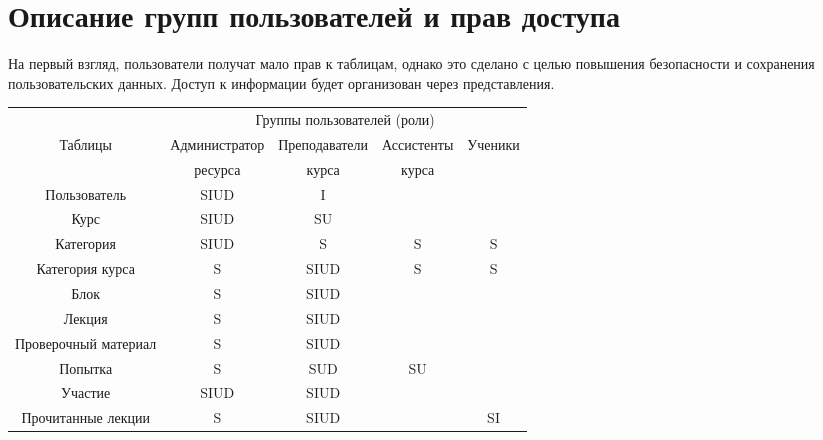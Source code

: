 \documentclass[a4paper,14pt]{article}
\begin{document}
\section{Описание групп пользователей и прав доступа}

На первый взгляд, пользователи получат мало прав  к таблицам, однако это сделано с целью повышения безопасности и сохранения пользовательских данных.
Доступ к информации будет организован через представления.

\begin{table}[H]
	\begin{flushleft} 
	\end{flushleft}
\begin{tabular}{|c|c|c|c|c|}
	\hline
	                     &   \multicolumn{4}{c|}{Группы пользователей (роли)}   \\ \cline{2-5}
	      Таблицы        & Администратор & Преподаватели & Ассистенты & Ученики \\
	                     &    ресурса    &     курса     &   курса    &         \\ \hline
	    Пользователь     &     SIUD      &       I       &            &         \\ \hline
	        Курс         &     SIUD      &      SU       &            &         \\ \hline
	     Категория       &     SIUD      &       S       &     S      &    S    \\ \hline
	  Категория курса    &       S       &     SIUD      &     S      &    S    \\ \hline
	        Блок         &       S       &     SIUD      &            &         \\ \hline
	       Лекция        &       S       &     SIUD      &            &         \\ \hline
	Проверочный материал &       S       &     SIUD      &            &         \\ \hline
	      Попытка        &       S       &      SUD      &     SU     &         \\ \hline
	      Участие        &     SIUD      &     SIUD      &            &         \\ \hline
	 Прочитанные лекции  &       S       &     SIUD      &            &   SI    \\ \hline
\end{tabular}
\end{table}
\end{document}

